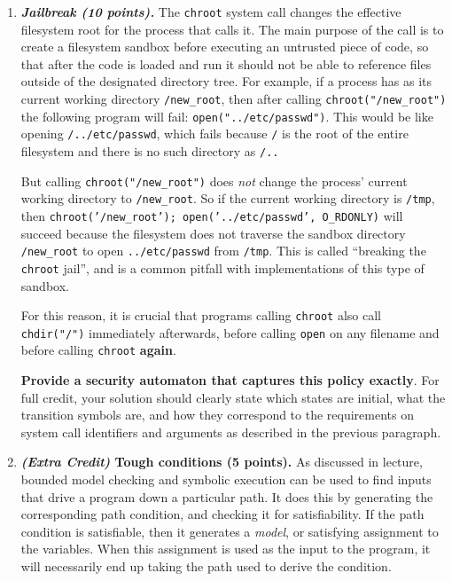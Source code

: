 \documentclass[10pt]{article}
\begin{document}
\begin{enumerate}
%


\item \textbf{\textit{Jailbreak (10 points).}} The \texttt{chroot} system call changes the effective filesystem root for the process that calls it. The main purpose of the call is to create a filesystem sandbox before executing an untrusted piece of code, so that after the code is loaded and run it should not be able to reference files outside of the designated directory tree. For example, if a process has as its current working directory \verb'/new_root', then after calling \verb'chroot("/new_root")' the following program will fail: \verb'open("../etc/passwd")'. This would be like opening \verb'/../etc/passwd', which fails because \verb'/' is the root of the entire filesystem and there is no such directory as \verb'/..'

But calling \verb'chroot("/new_root")' does \emph{not} change the process' current working directory to \verb'/new_root'. So if the current working directory is \verb'/tmp', then \texttt{chroot('/new\_root'); open('../etc/passwd', O\_RDONLY)} will succeed because the filesystem does not traverse the sandbox directory \verb'/new_root' to open \verb'../etc/passwd' from \verb'/tmp'. This is called ``breaking the \texttt{chroot} jail'', and is a common pitfall with implementations of this type of sandbox.

For this reason, it is crucial that programs calling \texttt{chroot} also call \verb'chdir("/")' immediately afterwards, before calling \verb'open' on any filename and before calling \verb'chroot' \textbf{again}. 

\textbf{Provide a security automaton that captures this policy exactly}. For full credit, your solution should clearly state which states are initial, what the transition symbols are, and how they correspond to the requirements on system call identifiers and arguments as described in the previous paragraph.


%


\item \textbf{\textit{(Extra Credit)} Tough conditions (5 points).} As discussed in lecture, bounded model checking and symbolic execution can be used to find inputs that drive a program down a particular path. It does this by generating the corresponding path condition, and checking it for satisfiability. If the path condition is satisfiable, then it generates a \emph{model}, or satisfying assignment to the variables. When this assignment is used as the input to the program, it will necessarily end up taking the path used to derive the condition.


\end{enumerate}
\end{document}
